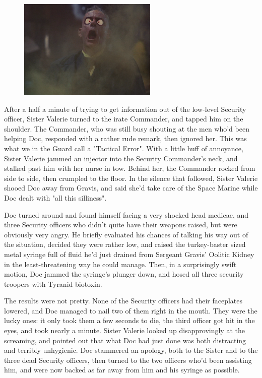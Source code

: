 \begin{figure}
	\begin{center}
		\includegraphics[width=\figwidth]{pics/14/33.png}
	\end{center}
\end{figure}
After a half a minute of trying to get information out of the low-level Security officer, Sister Valerie turned to the irate Commander, and tapped him on the shoulder. 
The Commander, who was still busy shouting at the men who'd been helping Doc, responded with a rather rude remark, then ignored her. 
This was what we in the Guard call a "Tactical Error". 
With a little huff of annoyance, Sister Valerie jammed an injector into the Security Commander's neck, and stalked past him with her nurse in tow. 
Behind her, the Commander rocked from side to side, then crumpled to the floor. 
In the silence that followed, Sister Valerie shooed Doc away from Gravis, and said she'd take care of the Space Marine while Doc dealt with "all this silliness".

Doc turned around and found himself facing a very shocked head medicae, and three Security officers who didn't quite have their weapons raised, but were obviously very angry. 
He briefly evaluated his chances of talking his way out of the situation, decided they were rather low, and raised the turkey-baster sized metal syringe full of fluid he'd just drained from Sergeant Gravis' Oolitic Kidney in the least-threatening way he could manage. 
Then, in a surprisingly swift motion, Doc jammed the syringe's plunger down, and hosed all three security troopers with Tyranid biotoxin.

The results were not pretty. 
None of the Security officers had their faceplates lowered, and Doc managed to nail two of them right in the mouth. 
They were the lucky ones: 
it only took them a few seconds to die, the third officer got hit in the eyes, and took nearly a minute. 
Sister Valerie looked up disapprovingly at the screaming, and pointed out that what Doc had just done was both distracting and terribly unhygienic. 
Doc stammered an apology, both to the Sister and to the three dead Security officers, then turned to the two officers who'd been assisting him, and were now backed as far away from him and his syringe as possible.

